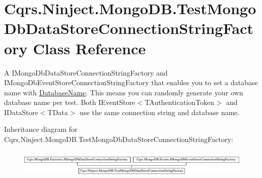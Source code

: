 \hypertarget{classCqrs_1_1Ninject_1_1MongoDB_1_1TestMongoDbDataStoreConnectionStringFactory}{}\section{Cqrs.\+Ninject.\+Mongo\+D\+B.\+Test\+Mongo\+Db\+Data\+Store\+Connection\+String\+Factory Class Reference}
\label{classCqrs_1_1Ninject_1_1MongoDB_1_1TestMongoDbDataStoreConnectionStringFactory}


A I\+Mongo\+Db\+Data\+Store\+Connection\+String\+Factory and I\+Mongo\+Db\+Event\+Store\+Connection\+String\+Factory that enables you to set a database name with \hyperlink{classCqrs_1_1Ninject_1_1MongoDB_1_1TestMongoDbDataStoreConnectionStringFactory_a53412e87f2114b8a61d6898f7f290187_a53412e87f2114b8a61d6898f7f290187}{Database\+Name}. This means you can randomly generate your own database name per test. Both I\+Event\+Store$<$\+T\+Authentication\+Token$>$ and I\+Data\+Store$<$\+T\+Data$>$ use the same connection string and database name.  


Inheritance diagram for Cqrs.\+Ninject.\+Mongo\+D\+B.\+Test\+Mongo\+Db\+Data\+Store\+Connection\+String\+Factory\+:\begin{figure}[H]
\begin{center}
\leavevmode
\includegraphics[height=1.308411cm]{classCqrs_1_1Ninject_1_1MongoDB_1_1TestMongoDbDataStoreConnectionStringFactory}
\end{center}
\end{figure}
